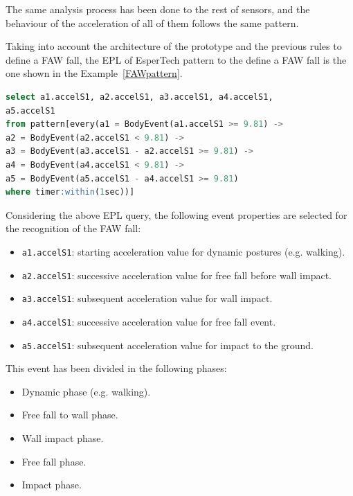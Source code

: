 \documentclass[journal]{IEEEtran}
\begin{document}
The same analysis process has been done to the rest of sensors, and the behaviour of the acceleration of all of 
them follows the same pattern.

Taking into account the architecture of the prototype and the previous rules to define a FAW fall, the EPL of EsperTech
pattern to the define a FAW fall is the one shown in the Example~\ref{FAWpattern}.

\begin{lstlisting}[basicstyle=\ttfamily\scriptsize,language=SQL, mathescape,caption=FAW pattern,label=FAWpattern]
select a1.accelS1, a2.accelS1, a3.accelS1, a4.accelS1, 
a5.accelS1 
from pattern[every(a1 = BodyEvent(a1.accelS1 >= 9.81) -> 
a2 = BodyEvent(a2.accelS1 < 9.81) ->
a3 = BodyEvent(a3.accelS1 - a2.accelS1 >= 9.81) ->
a4 = BodyEvent(a4.accelS1 < 9.81) ->
a5 = BodyEvent(a5.accelS1 - a4.accelS1 >= 9.81) 
where timer:within(1sec))]
\end{lstlisting}

Considering the above EPL query, the following event properties are selected for the recognition of the FAW fall:

\begin{itemize}
  \item \texttt{\small{a1.accelS1}}: starting acceleration value for dynamic postures (e.g. walking).
  \item \texttt{\small{a2.accelS1}}: successive acceleration value for free fall before wall impact.
  \item \texttt{\small{a3.accelS1}}: subsequent acceleration value for wall impact.
  \item \texttt{\small{a4.accelS1}}: successive acceleration value for free fall event.
  \item \texttt{\small{a5.accelS1}}: subsequent acceleration value for impact to the ground.
\end{itemize}

This event has been divided in the following phases:
\begin{itemize}
  \item Dynamic phase (e.g. walking).
  \item Free fall to wall phase.
  \item Wall impact phase.
  \item Free fall phase.
  \item Impact phase.
\end{itemize}
\end{document}
